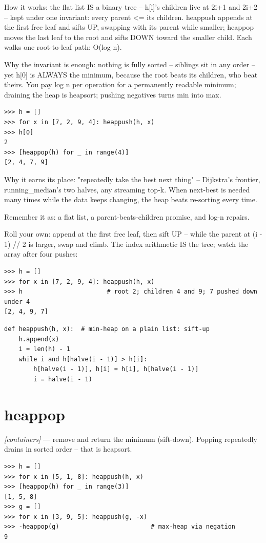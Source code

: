 \documentclass[11pt,letterpaper]{book}
\begin{document}
How it works: the flat list IS a binary tree -- h[i]'s children live at 2i+1 and 2i+2 -- kept under one invariant: every parent <= its children. heappush appends at the first free leaf and sifts UP, swapping with its parent while smaller; heappop moves the last leaf to the root and sifts DOWN toward the smaller child. Each walks one root-to-leaf path: O(log n).


Why the invariant is enough: nothing is fully sorted -- siblings sit in any order -- yet h[0] is ALWAYS the minimum, because the root beats its children, who beat theirs. You pay log n per operation for a permanently readable minimum; draining the heap is heapsort; pushing negatives turns min into max.

\begin{lstlisting}[style=spec]
>>> h = []
>>> for x in [7, 2, 9, 4]: heappush(h, x)
>>> h[0]
2
>>> [heappop(h) for _ in range(4)]
[2, 4, 7, 9]
\end{lstlisting}

Why it earns its place: "repeatedly take the best next thing" -- Dijkstra's frontier, running\_median's two halves, any streaming top-k. When next-best is needed many times while the data keeps changing, the heap beats re-sorting every time.


Remember it as: a flat list, a parent-beats-children promise, and log-n repairs.


Roll your own: append at the first free leaf, then sift UP -- while the parent at (i - 1) // 2 is larger, swap and climb. The index arithmetic IS the tree; watch the array after four pushes:

\begin{lstlisting}[style=spec]
>>> h = []
>>> for x in [7, 2, 9, 4]: heappush(h, x)
>>> h                       # root 2; children 4 and 9; 7 pushed down under 4
[2, 4, 9, 7]
\end{lstlisting}
\begin{lstlisting}[style=code]
def heappush(h, x):  # min-heap on a plain list: sift-up
    h.append(x)
    i = len(h) - 1
    while i and h[halve(i - 1)] > h[i]:
        h[halve(i - 1)], h[i] = h[i], h[halve(i - 1)]
        i = halve(i - 1)
\end{lstlisting}

\section{heappop}
\noindent\textit{[containers]} --- remove and return the minimum (sift-down). Popping repeatedly drains in sorted order -- that is heapsort.
\begin{lstlisting}[style=spec]
>>> h = []
>>> for x in [5, 1, 8]: heappush(h, x)
>>> [heappop(h) for _ in range(3)]
[1, 5, 8]
>>> g = []
>>> for x in [3, 9, 5]: heappush(g, -x)
>>> -heappop(g)                         # max-heap via negation
9
\end{lstlisting}
\end{document}
